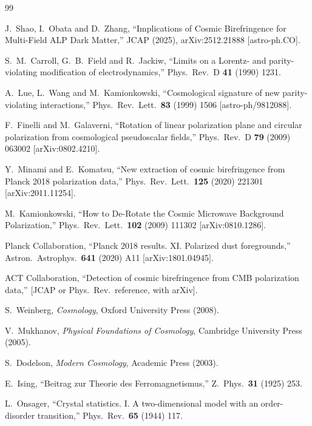 \documentclass[12pt]{article}
\begin{document}
\newpage
\begin{thebibliography}{99}

J.~Shao, I.~Obata and D.~Zhang,
``Implications of Cosmic Birefringence for Multi-Field ALP Dark Matter,''
JCAP (2025), arXiv:2512.21888 [astro-ph.CO].

S.~M.~Carroll, G.~B.~Field and R.~Jackiw,
``Limits on a Lorentz- and parity-violating modification of electrodynamics,''
Phys.\ Rev.\ D {\bf 41} (1990) 1231.

A.~Lue, L.~Wang and M.~Kamionkowski,
``Cosmological signature of new parity-violating interactions,''
Phys.\ Rev.\ Lett.\ {\bf 83} (1999) 1506
[astro-ph/9812088].

F.~Finelli and M.~Galaverni,
``Rotation of linear polarization plane and circular polarization from cosmological pseudoscalar fields,''
Phys.\ Rev.\ D {\bf 79} (2009) 063002
[arXiv:0802.4210].

Y.~Minami and E.~Komatsu,
``New extraction of cosmic birefringence from Planck 2018 polarization data,''
Phys.\ Rev.\ Lett.\ {\bf 125} (2020) 221301
[arXiv:2011.11254].

M.~Kamionkowski,
``How to De-Rotate the Cosmic Microwave Background Polarization,''
Phys.\ Rev.\ Lett.\ {\bf 102} (2009) 111302
[arXiv:0810.1286].

Planck Collaboration,
``Planck 2018 results. XI. Polarized dust foregrounds,''
Astron.\ Astrophys.\ {\bf 641} (2020) A11
[arXiv:1801.04945].

ACT Collaboration,
``Detection of cosmic birefringence from CMB polarization data,''
[JCAP or Phys.\ Rev.\ reference, with arXiv].

S.~Weinberg,
\textit{Cosmology},
Oxford University Press (2008).

V.~Mukhanov,
\textit{Physical Foundations of Cosmology},
Cambridge University Press (2005).

S.~Dodelson,
\textit{Modern Cosmology},
Academic Press (2003).

E.~Ising,
``Beitrag zur Theorie des Ferromagnetismus,''
Z.\ Phys.\ {\bf 31} (1925) 253.

L.~Onsager,
``Crystal statistics. I. A two-dimensional model with an order-disorder transition,''
Phys.\ Rev.\ {\bf 65} (1944) 117.


\end{thebibliography}
\end{document}
